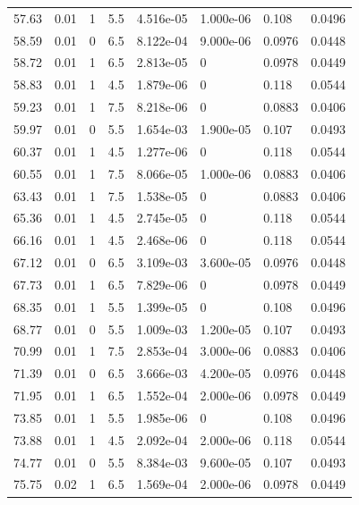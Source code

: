 \documentclass[preview]{standalone}
\begin{document}
{{{\begin{tabular}{L{1.2cm}C{1.2cm} C{0.3cm}C{0.5cm} C{1.4cm}C{1.4cm} C{1.4cm}C{1.4cm}}
  57.63  &  0.01  & 1     & 5.5 &  4.516e-05  & 1.000e-06  & 0.108 &  0.0496   \\ 
  58.59  &  0.01  & 0     & 6.5 &  8.122e-04  & 9.000e-06  & 0.0976 &  0.0448   \\ 
  58.72  &  0.01  & 1     & 6.5 &  2.813e-05  & 0  & 0.0978 &  0.0449   \\ 
  58.83  &  0.01  & 1     & 4.5 &  1.879e-06  & 0  & 0.118 &  0.0544   \\ 
  59.23  &  0.01  & 1     & 7.5 &  8.218e-06  & 0  & 0.0883 &  0.0406   \\ 
  59.97  &  0.01  & 0     & 5.5 &  1.654e-03  & 1.900e-05  & 0.107 &  0.0493   \\ 
  60.37  &  0.01  & 1     & 4.5 &  1.277e-06  & 0  & 0.118 &  0.0544   \\ 
  60.55  &  0.01  & 1     & 7.5 &  8.066e-05  & 1.000e-06  & 0.0883 &  0.0406   \\ 
  63.43  &  0.01  & 1     & 7.5 &  1.538e-05  & 0  & 0.0883 &  0.0406   \\ 
  65.36  &  0.01  & 1     & 4.5 &  2.745e-05  & 0  & 0.118 &  0.0544   \\ 
  66.16  &  0.01  & 1     & 4.5 &  2.468e-06  & 0  & 0.118 &  0.0544   \\ 
  67.12  &  0.01  & 0     & 6.5 &  3.109e-03  & 3.600e-05  & 0.0976 &  0.0448   \\ 
  67.73  &  0.01  & 1     & 6.5 &  7.829e-06  & 0  & 0.0978 &  0.0449   \\ 
  68.35  &  0.01  & 1     & 5.5 &  1.399e-05  & 0  & 0.108 &  0.0496   \\ 
  68.77  &  0.01  & 0     & 5.5 &  1.009e-03  & 1.200e-05  & 0.107 &  0.0493   \\ 
  70.99  &  0.01  & 1     & 7.5 &  2.853e-04  & 3.000e-06  & 0.0883 &  0.0406   \\ 
  71.39  &  0.01  & 0     & 6.5 &  3.666e-03  & 4.200e-05  & 0.0976 &  0.0448   \\ 
  71.95  &  0.01  & 1     & 6.5 &  1.552e-04  & 2.000e-06  & 0.0978 &  0.0449   \\ 
  73.85  &  0.01  & 1     & 5.5 &  1.985e-06  & 0  & 0.108 &  0.0496   \\ 
  73.88  &  0.01  & 1     & 4.5 &  2.092e-04  & 2.000e-06  & 0.118 &  0.0544   \\ 
  74.77  &  0.01  & 0     & 5.5 &  8.384e-03  & 9.600e-05  & 0.107 &  0.0493   \\ 
  75.75  &  0.02  & 1     & 6.5 &  1.569e-04  & 2.000e-06  & 0.0978 &  0.0449   \\ 

\end{tabular}}}}
\end{document}

